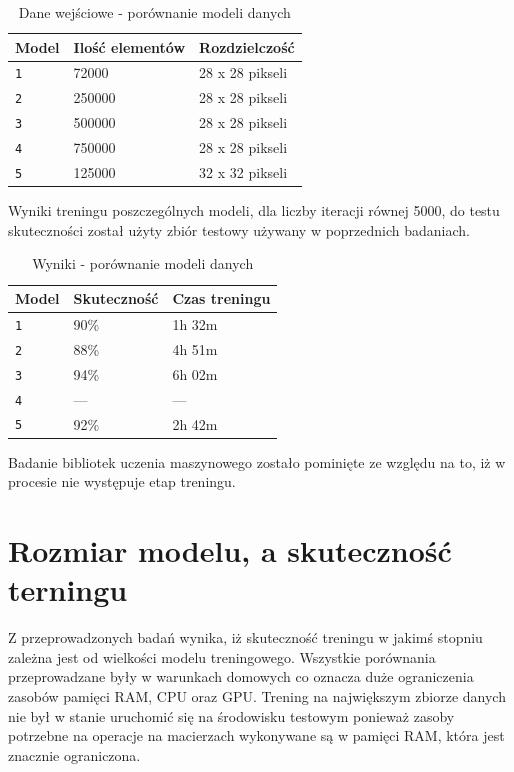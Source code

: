 \documentclass[brudnopis]{xmgr}
\begin{document}
\begin{table}[!htb]
\begin{tabular}{|l|l|l|} \hline
Model & Ilość elementów & Rozdzielczość  \\ \hline
\texttt 1 & 72000 & 28 x 28 pikseli \\ \hline
\texttt 2 & 250000 & 28 x 28 pikseli \\ \hline
\texttt 3 & 500000 & 28 x 28 pikseli \\ \hline
\texttt 4 & 750000 & 28 x 28 pikseli \\ \hline
\texttt 5 & 125000 & 32 x 32 pikseli \\ \hline
\end{tabular}
\caption{Dane wejściowe - porównanie modeli danych}
\end{table}

Wyniki treningu poszczególnych modeli, dla liczby iteracji równej 5000, do testu skuteczności został użyty zbiór testowy używany w poprzednich badaniach.

\begin{table}[!htb]
\begin{tabular}{|l|l|l|} \hline
Model & Skuteczność & Czas treningu  \\ \hline
\texttt 1 & 90\% & 1h 32m \\ \hline
\texttt 2 & 88\% & 4h 51m \\ \hline
\texttt 3 & 94\% & 6h 02m \\ \hline
\texttt 4 & --- & --- \\ \hline 
\texttt 5 & 92\% & 2h 42m \\ \hline
\end{tabular}
\caption{Wyniki - porównanie modeli danych}
\end{table}

Badanie bibliotek uczenia maszynowego zostało pominięte ze względu na to, iż w procesie nie występuje etap treningu.

\section{Rozmiar modelu, a skuteczność terningu}

Z przeprowadzonych badań wynika, iż skuteczność treningu w jakimś stopniu zależna jest od wielkości modelu treningowego. Wszystkie porównania przeprowadzane były w warunkach domowych co oznacza duże ograniczenia zasobów pamięci RAM, CPU oraz GPU. Trening na największym zbiorze danych nie był w stanie uruchomić się na środowisku testowym ponieważ zasoby potrzebne na operacje na macierzach wykonywane są w pamięci RAM, która jest znacznie ograniczona. 
\end{document}
